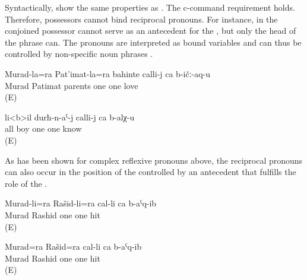 Syntactically,  show the same properties as . The c-command
requirement holds. Therefore, possessors cannot bind reciprocal pronouns. For instance, in  the conjoined possessor  cannot serve as an antecedent for the , but only the head of the  phrase can. The pronouns are interpreted as bound variables and can thus be controlled by non-specific noun phrases .

\begin{exe}
	\ex	\label{ex:Murad and Patimat's parents love each other.}
	\gll	Murad-la=ra Pat'imat-la=ra bahinte calli-j ca b-ičː-aq-u\\
		Murad	Patimat	parents	one	one	love\\
	\glt	{} (E)

	\ex	\label{ex:All boys know each other}
	\gll	li<b>il	durħ-n-aˁ-j	calli-j	ca	b-alχ-u\\
		all	 boy	one	one	know\\
	\glt	{} (E)
\end{exe}

As has been shown for complex reflexive pronouns above, the reciprocal pronouns can also occur in the position of the   controlled by an antecedent that fulfills the role of the  . 

\begin{exe}
	\ex	\label{ex:‎Murad and Rashid hit each other}
	\begin{xlist}
		\ex	\label{ex:‎Murad and Rashid hit each other@A}
		\gll	Murad-li=ra	Rašid-li=ra	cal-li	ca	b-aˁq-ib\\
			Murad	Rashid	one	one	hit\\
		\glt	{} (E)
	
		\ex	\label{ex:‎Murad and Rashid hit each other@B}
		\gll	Murad=ra	Rašid=ra	cal-li	ca	b-aˁq-ib\\
			Murad\tsc{=add}	Rashid	one	one	hit\\
		\glt	{} (E)
	\end{xlist}
\end{exe}

